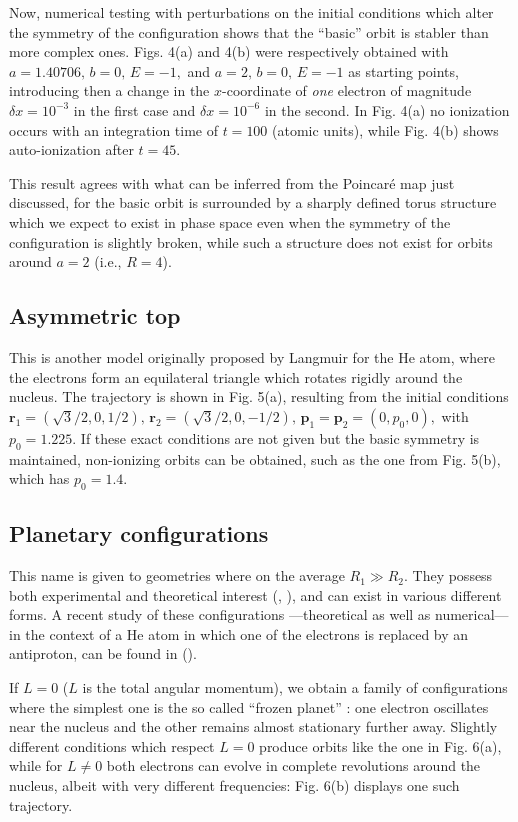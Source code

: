 \documentclass[thmsa]{article}
\begin{document}
Now, numerical testing with perturbations on the initial conditions which
alter the symmetry of the configuration shows that the ``basic'' orbit is
stabler than more complex ones. Figs. 4(a) and 4(b) were respectively
obtained with $a=1.40706,\,b=0,\,E=-1,$ and $a=2,\,b=0,\,E=-1$ as starting
points, introducing then a change in the $x$-coordinate of \emph{one}
electron of magnitude $\delta x=10^{-3}$ in the first case and $\delta
x=10^{-6}$ in the second. In Fig. 4(a) no ionization occurs with an
integration time of $t=100$ (atomic units), while Fig. 4(b) shows
auto-ionization after $t=45.$

This result agrees with what can be inferred from the Poincar\'e map just
discussed, for the basic orbit is surrounded by a sharply defined torus
structure which we expect to exist in phase space even when the symmetry of
the configuration is slightly broken, while such a structure does not exist
for orbits around $a=2$ (i.e., $R=4$).

\subsection{Asymmetric top}

This is another model originally proposed by Langmuir for the He atom, where
the electrons form an equilateral triangle which rotates rigidly around the
nucleus. The trajectory is shown in Fig. 5(a), resulting from the initial
conditions $\mathbf{r}_1=\left( \sqrt{3}/2,0,1/2\right) ,\,\mathbf{r}%
_2=\left( \sqrt{3}/2,0,-1/2\right) ,\,\mathbf{p}_1=\mathbf{p}_2=\left(
0,p_0,0\right) ,$ with $p_0=1.225.$ If these exact conditions are not given
but the basic symmetry is maintained, non-ionizing orbits can be obtained,
such as the one from Fig. 5(b), which has $p_0=1.4$.

\subsection{Planetary configurations}

This name is given to geometries where on the average $R_1\gg R_2$. They
possess both experimental and theoretical interest (\cite{Richter(frozen)}, 
\cite{Richter(planet)}), and can exist in various different forms. A recent
study of these configurations ---theoretical as well as numerical--- in the
context of a He atom in which one of the electrons is replaced by an
antiproton, can be found in (\cite{Benvenuto}).

If $L=0$ ($L$ is the total angular momentum), we obtain a family of
configurations where the simplest one is the so called ``frozen planet'' 
\cite{Richter(frozen)}: one electron oscillates near the nucleus and the
other remains almost stationary further away. Slightly different conditions
which respect $L=0$ produce orbits like the one in Fig. 6(a), while for $%
L\neq 0$ both electrons can evolve in complete revolutions around the
nucleus, albeit with very different frequencies: Fig. 6(b) displays one such
trajectory.
\end{document}
